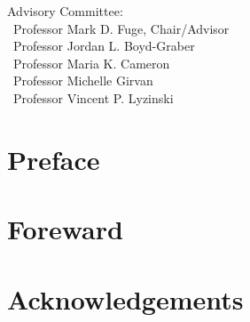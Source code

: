 \documentclass[%
	12pt,
		oneside,
		letterpaper
]{book}
\renewcommand{\contentsname}%
    {Table of contents}%
\renewcommand*\contentsname{Table of contents}
\newcommand\contentsname{Table of contents}
\begin{document}
\vspace{7.5em}

\noindent Advisory Committee: \\
\hbox{\ }\hspace{.5in}Professor Mark D. Fuge, Chair/Advisor \\
\hbox{\ }\hspace{.5in}Professor Jordan L. Boyd-Graber \\
\hbox{\ }\hspace{.5in}Professor Maria K. Cameron \\
\hbox{\ }\hspace{.5in}Professor Michelle Girvan \\
\hbox{\ }\hspace{.5in}Professor Vincent P. Lyzinski \\
 \doublespacing


% 

% 
{}




\chapter*{Preface}\label{preface}




\chapter*{Foreward}\label{foreward}



\chapter*{Acknowledgements}\label{acknowledgements}


    \renewcommand{\contentsname}{Table of Contents}
\renewcommand{\baselinestretch}{1}
\small\normalsize
\tableofcontents %
\newpage
\end{document}
